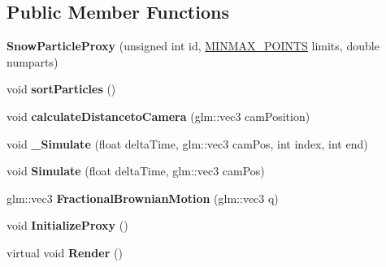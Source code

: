 \subsection*{Public Member Functions}
\begin{DoxyCompactItemize}
\item 
{\bfseries Snow\+Particle\+Proxy} (unsigned int id, \hyperlink{struct_m_i_n_m_a_x___p_o_i_n_t_s}{M\+I\+N\+M\+A\+X\+\_\+\+P\+O\+I\+N\+TS} limits, double numparts)\hypertarget{class_snow_particle_proxy_a97f249591d8c2ad4f6d7e12477f2c055}{}\label{class_snow_particle_proxy_a97f249591d8c2ad4f6d7e12477f2c055}

\item 
void {\bfseries sort\+Particles} ()\hypertarget{class_snow_particle_proxy_a10527dec808f3fa0b33d9bfea7e6bd59}{}\label{class_snow_particle_proxy_a10527dec808f3fa0b33d9bfea7e6bd59}

\item 
void {\bfseries calculate\+Distanceto\+Camera} (glm\+::vec3 cam\+Position)\hypertarget{class_snow_particle_proxy_af8cdb5f1cf26e8e970a13ac0b669a7d5}{}\label{class_snow_particle_proxy_af8cdb5f1cf26e8e970a13ac0b669a7d5}

\item 
void {\bfseries \+\_\+\+Simulate} (float delta\+Time, glm\+::vec3 cam\+Pos, int index, int end)\hypertarget{class_snow_particle_proxy_ae862b5caa3807f41f3ba7bb982ec3184}{}\label{class_snow_particle_proxy_ae862b5caa3807f41f3ba7bb982ec3184}

\item 
void {\bfseries Simulate} (float delta\+Time, glm\+::vec3 cam\+Pos)\hypertarget{class_snow_particle_proxy_adebca0b22e66d988354d734fc49df352}{}\label{class_snow_particle_proxy_adebca0b22e66d988354d734fc49df352}

\item 
glm\+::vec3 {\bfseries Fractional\+Brownian\+Motion} (glm\+::vec3 q)\hypertarget{class_snow_particle_proxy_a82ece4fbb4271253f4891fd743642bff}{}\label{class_snow_particle_proxy_a82ece4fbb4271253f4891fd743642bff}

\item 
void {\bfseries Initialize\+Proxy} ()\hypertarget{class_snow_particle_proxy_a379466736b5bb201ebabffa133e77ad5}{}\label{class_snow_particle_proxy_a379466736b5bb201ebabffa133e77ad5}

\item 
virtual void {\bfseries Render} ()\hypertarget{class_snow_particle_proxy_a9ee34d535e299338921a2fbaeb8333f0}{}\label{class_snow_particle_proxy_a9ee34d535e299338921a2fbaeb8333f0}

\end{DoxyCompactItemize}
